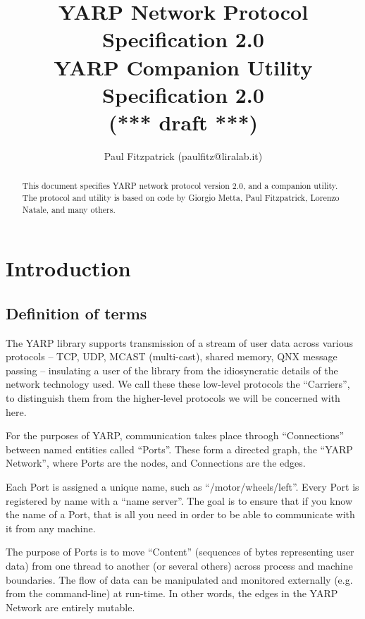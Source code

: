 \documentclass[a4]{article}
\title{
YARP Network Protocol Specification 2.0 \\
YARP Companion Utility Specification 2.0 \\
(*** draft ***)
}
\author{Paul Fitzpatrick (paulfitz@liralab.it)}
\begin{document}
\maketitle


\begin{abstract}

\noindent
This document specifies YARP network protocol version 2.0,
and a companion utility.  The
protocol and utility is based on code by Giorgio
Metta, Paul Fitzpatrick, Lorenzo Natale, and many others.

\end{abstract}



\tableofcontents

\section{Introduction}

\subsection{Definition of terms}

The YARP library supports transmission of a stream of
user data across
various protocols -- TCP, UDP, MCAST (multi-cast), shared memory, QNX
message passing -- insulating a user of the library from the
idiosyncratic details of the network technology used.  We call these
these low-level protocols the ``Carriers'', to distinguish them from
the higher-level protocols we will be concerned with here.

For the purposes of YARP, communication takes place throogh
``Connections'' between named entities called ``Ports''.
These form a directed graph, the ``YARP Network'', where Ports are the nodes,
and Connections are the edges.

Each Port is assigned a unique name, such as ``/motor/wheels/left''.  
Every Port is registered by name with
a ``name server''.  The goal is to ensure that if you know the name
of a Port, that is all you need in order to be able to 
communicate with it from any machine.

The purpose of Ports is to move ``Content'' (sequences of bytes representing 
user data) from
one thread to another (or several others) across process and machine
boundaries.  The flow of data can be manipulated and monitored
externally (e.g. from the command-line) at run-time.  In other words,
the edges in the YARP Network are entirely mutable.
\end{document}
